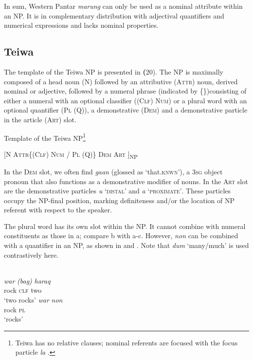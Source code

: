  In sum, Western Pantar \textit{marung} can only be used as a nominal attribute within an NP. It is in complementary distribution with adjectival quantifiers and numerical expressions and lacks nominal properties.

\subsection{Teiwa} %
\label{sec:9:3.2}
The template of the Teiwa NP is presented in \textbf{(}20). The NP is maximally composed of a head noun (N) followed by an attributive (\textsc{Attr)} noun, derived nominal or adjective\textsc{,} followed by a numeral phrase (indicated by \{\})consisting of either a numeral with an optional classifier (\textsc{(Clf)} \textsc{Num)} or a plural word with an optional quantifier (\textsc{Pl} \textsc{(Q)),} a demonstrative \textsc{(Dem)} and a demonstrative particle in the article (\textsc{Art)} slot.

\ea%
\label{ex:9:20}

 Template of the Teiwa NP\footnote{Teiwa has no relative clauses; nominal referents are focused with the focus particle \textit{la} \citep{Klamer2010}.}

 [\textsc{N  Attr\{(Clf) Num / Pl (Q)\}  Dem Art ]}\textsc{\textsubscript{NP}}
\z

In the \textsc{Dem} slot, we often find \textit{ga}\textit{{\textglotstop}}\textit{an} (glossed as `that.\textsc{knwn}'), a 3\textsc{sg} object pronoun that also functions as a demonstrative modifier of nouns. In the \textsc{Art} slot are the demonstrative particles \textit{u} `\textsc{distal'} and \textit{a} `\textsc{proximate'}. These particles occupy the NP-final position, marking definiteness and/or the location of NP referent with respect to the speaker.

The plural word has its own slot within the NP. It cannot combine with numeral constituents as those in a; compare b with a-c. However, \textit{non} can be combined with a quantifier in an NP, as shown in  and . Note that \textit{dum} `many/much' is used contrastively here.


\ea%
\label{ex:9:21}
 \\
\ea
\gll \textit{war} \textit{(bag)} \textit{haraq}  \\
  rock \textsc{clf} two \\
\glt `two rocks'
\ex
\gll \textit{war} \textit{non}\\
  rock \textsc{pl}\\
 `rocks'
\z
\z


